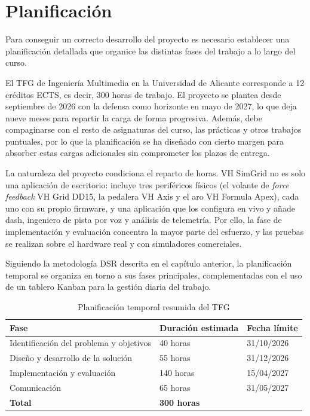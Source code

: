 \chapter{Planificación}
\label{cap:planificacion}

Para conseguir un correcto desarrollo del proyecto es necesario establecer una planificación detallada que organice las distintas fases del trabajo a lo largo del curso.

El TFG de Ingeniería Multimedia en la Universidad de Alicante corresponde a 12 créditos ECTS, es decir, 300 horas de trabajo. El proyecto se plantea desde septiembre de 2026 con la defensa como horizonte en mayo de 2027, lo que deja nueve meses para repartir la carga de forma progresiva. Además, debe compaginarse con el resto de asignaturas del curso, las prácticas y otros trabajos puntuales, por lo que la planificación se ha diseñado con cierto margen para absorber estas cargas adicionales sin comprometer los plazos de
entrega.

La naturaleza del proyecto condiciona el reparto de horas. VH SimGrid no es solo una aplicación de escritorio: incluye tres periféricos físicos (el volante de \textit{force feedback} VH Grid DD15, la pedalera VH Axis y el aro VH Formula Apex), cada uno con su propio firmware, y una aplicación que los configura en vivo y añade dash, ingeniero de pista por voz y análisis de telemetría. Por ello, la fase de implementación y evaluación concentra la mayor parte del esfuerzo, y las pruebas se realizan sobre el hardware real y con
simuladores comerciales.

Siguiendo la metodología DSR descrita en el capítulo anterior, la planificación temporal se organiza en torno a sus fases principales, complementadas con el uso de un tablero Kanban para la gestión diaria del trabajo.

\begin{table}[H]
	\centering
	\renewcommand{\arraystretch}{2}
	\begin{tabular}{|l|p{4cm}|l|}
		\hline
		\textbf{Fase} & \textbf{Duración estimada} & \textbf{Fecha límite} \\
		\hline
		Identificación del problema y objetivos & 40 horas & 31/10/2026 \\
		\hline
		Diseño y desarrollo de la solución & 55 horas & 31/12/2026 \\
		\hline
		Implementación y evaluación & 140 horas & 15/04/2027 \\
		\hline
		Comunicación & 65 horas & 31/05/2027 \\
		\hline
		\textbf{Total} & \textbf{300 horas} & \\
		\hline
	\end{tabular}
	\caption{Planificación temporal resumida del TFG}
	\label{tab:planificacion}
\end{table}

